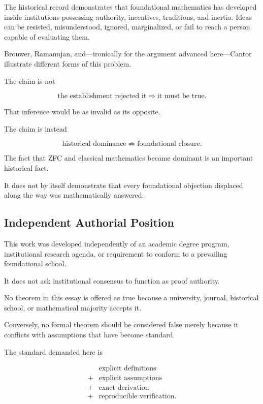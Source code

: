 \documentclass[11pt,a4paper]{article}
\begin{document}
The historical record demonstrates that foundational mathematics has
developed inside institutions possessing authority, incentives,
traditions, and inertia. Ideas can be resisted, misunderstood, ignored,
marginalized, or fail to reach a person capable of evaluating them.

Brouwer, Ramanujan, and---ironically for the argument advanced
here---Cantor illustrate different forms of this problem.

The claim is not

\[
\text{the establishment rejected it}
\Longrightarrow
\text{it must be true}.
\]

That inference would be as invalid as its opposite.

The claim is instead

\[
\boxed{
\text{historical dominance}
\not\Rightarrow
\text{foundational closure}.
}
\]

The fact that ZFC and classical mathematics became dominant is an
important historical fact.

It does not by itself demonstrate that every foundational objection
displaced along the way was mathematically answered.

\subsection{Independent Authorial Position}

This work was developed independently of an academic degree program,
institutional research agenda, or requirement to conform to a
prevailing foundational school.

It does not ask institutional consensus to function as proof authority.

No theorem in this essay is offered as true because a university,
journal, historical school, or mathematical majority accepts it.

Conversely, no formal theorem should be considered false merely because
it conflicts with assumptions that have become standard.

The standard demanded here is

\[
\boxed{
\begin{aligned}
&\text{explicit definitions}\\
+{}&\text{explicit assumptions}\\
+{}&\text{exact derivation}\\
+{}&\text{reproducible verification}.
\end{aligned}
}
\]
\end{document}
